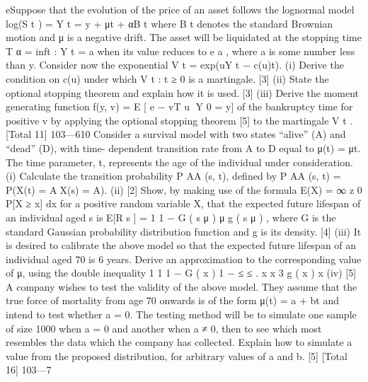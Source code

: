 \documentclass[a4paper,12pt]{article}
\begin{document}
\begin{enumerate}
eSuppose that the evolution of the price of an asset follows the lognormal model
log(S t ) = Y t = y + μt + αB t where B t denotes the standard Brownian motion and μ
is a negative drift. The asset will be liquidated at the stopping time
T α = inf{t : Y t = a} when its value reduces to e a , where a is some number less than
y. Consider now the exponential V t = exp(uY t − c(u)t).
(i) Derive the condition on c(u) under which {V t : t ≥ 0} is a martingale.
[3]
(ii) State the optional stopping theorem and explain how it is used.
[3]
(iii) Derive the moment generating function f(y, v) = E [ e − vT u Y 0 = y] of the
bankruptcy time for positive v by applying the optional stopping theorem
[5]
to the martingale V t .
[Total 11]
103—610
Consider a survival model with two states “alive” (A) and “dead” (D), with time-
dependent transition rate from A to D equal to μ(t) = μt. The time parameter, t,
represents the age of the individual under consideration.
(i)
Calculate the transition probability P AA (s, t), defined by
P AA (s, t) = P(X(t) = AX(s) = A).
(ii)
[2]
Show, by making use of the formula
E(X) =
∞
z 0
P[X ≥ x] dx
for a positive random variable X, that the expected future lifespan of an
individual aged s is
E[R s ] =
1 1 − G ( s μ )
μ
g ( s μ )
,
where G is the standard Gaussian probability distribution function and g
is its density.
[4]
(iii)
It is desired to calibrate the above model so that the expected future
lifespan of an individual aged 70 is 6 years. Derive an approximation to
the corresponding value of μ, using the double inequality
1
1 1 − G ( x ) 1
−
≤
≤ .
x x 3
g ( x )
x
(iv)
[5]
A company wishes to test the validity of the above model. They assume
that the true force of mortality from age 70 onwards is of the form
μ(t) = a + bt and intend to test whether a = 0. The testing method will be
to simulate one sample of size 1000 when a = 0 and another when a ≠ 0,
then to see which most resembles the data which the company has
collected.
Explain how to simulate a value from the proposed distribution, for
arbitrary values of a and b.
[5]
[Total 16]
103—7


\end{enumerate}
\end{document}
